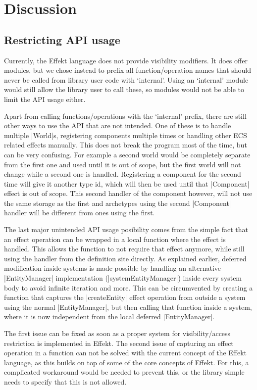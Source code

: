\chapter{Discussion}\label{chap:discussion}

\section{Restricting API usage}

Currently, the Effekt language does not provide visibility modifiers. It does offer modules, but we chose instead to prefix all function/operation names that should never be called from library user code with `internal'. Using an `internal' module would still allow the library user to call these, so modules would not be able to limit the API usage either.

Apart from calling functions/operations with the `internal' prefix, there are still other ways to use the API that are not intended. One of these is to handle multiple |World|s, registering components multiple times or handling other ECS related effects manually. This does not break the program most of the time, but can be very confusing. For example a second world would be completely separate from the first one and used until it is out of scope, but the first world will not change while a second one is handled. Registering a component for the second time will give it another type id, which will then be used until that |Component| effect is out of scope. This second handler of the component however, will not use the same storage as the first and archetypes using the second |Component| handler will be different from ones using the first.

The last major unintended API usage posibility comes from the simple fact that an effect operation can be wrapped in a local function where the effect is handled. This allows the function to not require that effect anymore, while still using the handler from the definition site directly. As explained earlier, deferred modification inside systems is made possible by handling an alternative |EntityManager| implementation (|systemEntityManager|) inside every system body to avoid infinite iteration and more. This can be circumvented by creating a function that captures the |createEntity| effect operation from outside a system using the normal |EntityManager|, but then calling that function inside a system, where it is now independent from the local deferred |EntityManager|.

The first issue can be fixed as soon as a proper system for visibility/access restriction is implemented in Effekt. The second issue of capturing an effect operation in a function can not be solved with the current concept of the Effekt language, as this builds on top of some of the core concepts of Effekt. For this, a complicated workaround would be needed to prevent this, or the library simple needs to specify that this is not allowed.

